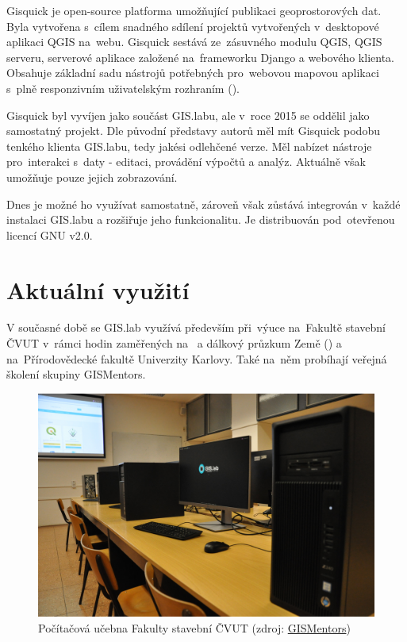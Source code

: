 Gisquick je open-source platforma umožňující publikaci geoprostorových
dat. Byla vytvořena s~cílem snadného sdílení projektů vytvořených v~desktopové 
aplikaci QGIS na~webu. Gisquick sestává ze~zásuvného modulu
QGIS, QGIS serveru, serverové aplikace založené na~frameworku Django a 
webového klienta. Obsahuje základní sadu nástrojů
potřebných pro~webovou mapovou aplikaci s~plně responzivním uživatelským
rozhraním (). \cite{gisquick-main}

Gisquick byl vyvíjen jako součást GIS.labu, ale v~roce 2015 se oddělil
jako samostatný projekt. Dle původní představy autorů měl mít Gisquick
podobu tenkého klienta GIS.labu, tedy jakési odlehčené verze. Měl 
nabízet nástroje pro~interakci s~daty - editaci, provádění výpočtů a analýz.
Aktuálně však umožňuje pouze jejich zobrazování. 

Dnes je možné ho využívat samostatně, zároveň však zůstává integrován 
v~každé instalaci GIS.labu a rozšiřuje jeho funkcionalitu. Je distribuován 
pod~otevřenou licencí GNU  v2.0. \cite{gisquick-doc}

\section{Aktuální využití}
\label{gislab-vyuziti}

V současné době se GIS.lab využívá především při~výuce na~Fakultě
stavební ČVUT v~rámci hodin zaměřených na~ a dálkový průzkum
Země () a na~Přírodovědec\-ké fakultě Univerzity Karlovy. Také
na~něm probíhají veřejná školení skupiny GISMentors.

\begin{figure}[H] \centering
    \includegraphics[width=350pt]{./pictures/classroom.jpg}
    \caption[Počítačová učebna Fakulty stavební ČVUT]{Počítačová učebna Fakulty stavební ČVUT (zdroj:
	\href{http://gismentors.cz/wp-content/uploads/2018/12/DSC_0051.jpg}{GISMentors})}
    \label{fig:gisquick-welcome}
\end{figure}

